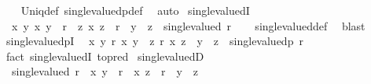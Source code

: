 \begin{isabellebody}
\ \ %
\endisadelimproof
%
\isatagproof
{}\isamarkupfalse%
\ Uniq{\isacharunderscore}{\kern0pt}def\ single{\isacharunderscore}{\kern0pt}valuedp{\isacharunderscore}{\kern0pt}def\ \isamarkupfalse%
\ auto%
\endisatagproof
{\isafoldproof}%
%
\isadelimproof
\isanewline
%
\endisadelimproof
\isanewline
{}\isamarkupfalse%
\ single{\isacharunderscore}{\kern0pt}valuedI{\isacharcolon}{\kern0pt}\isanewline
\ \ {\isachardoublequoteopen}{\isacharparenleft}{\kern0pt}{\isasymAnd}x\ y{\isachardot}{\kern0pt}\ {\isacharparenleft}{\kern0pt}x{\isacharcomma}{\kern0pt}\ y{\isacharparenright}{\kern0pt}\ {\isasymin}\ r\ {\isasymLongrightarrow}\ {\isacharparenleft}{\kern0pt}{\isasymAnd}z{\isachardot}{\kern0pt}\ {\isacharparenleft}{\kern0pt}x{\isacharcomma}{\kern0pt}\ z{\isacharparenright}{\kern0pt}\ {\isasymin}\ r\ {\isasymLongrightarrow}\ y\ {\isacharequal}{\kern0pt}\ z{\isacharparenright}{\kern0pt}{\isacharparenright}{\kern0pt}\ {\isasymLongrightarrow}\ single{\isacharunderscore}{\kern0pt}valued\ r{\isachardoublequoteclose}\isanewline
%
\isadelimproof
\ \ %
\endisadelimproof
%
\isatagproof
{}\isamarkupfalse%
\ single{\isacharunderscore}{\kern0pt}valued{\isacharunderscore}{\kern0pt}def\ \isamarkupfalse%
\ blast%
\endisatagproof
{\isafoldproof}%
%
\isadelimproof
\isanewline
%
\endisadelimproof
\isanewline
{}\isamarkupfalse%
\ single{\isacharunderscore}{\kern0pt}valuedpI{\isacharcolon}{\kern0pt}\isanewline
\ \ {\isachardoublequoteopen}{\isacharparenleft}{\kern0pt}{\isasymAnd}x\ y{\isachardot}{\kern0pt}\ r\ x\ y\ {\isasymLongrightarrow}\ {\isacharparenleft}{\kern0pt}{\isasymAnd}z{\isachardot}{\kern0pt}\ r\ x\ z\ {\isasymLongrightarrow}\ y\ {\isacharequal}{\kern0pt}\ z{\isacharparenright}{\kern0pt}{\isacharparenright}{\kern0pt}\ {\isasymLongrightarrow}\ single{\isacharunderscore}{\kern0pt}valuedp\ r{\isachardoublequoteclose}\isanewline
%
\isadelimproof
\ \ %
\endisadelimproof
%
\isatagproof
{}\isamarkupfalse%
\ {\isacharparenleft}{\kern0pt}fact\ single{\isacharunderscore}{\kern0pt}valuedI\ {\isacharbrackleft}{\kern0pt}to{\isacharunderscore}{\kern0pt}pred{\isacharbrackright}{\kern0pt}{\isacharparenright}{\kern0pt}%
\endisatagproof
{\isafoldproof}%
%
\isadelimproof
\isanewline
%
\endisadelimproof
\isanewline
{}\isamarkupfalse%
\ single{\isacharunderscore}{\kern0pt}valuedD{\isacharcolon}{\kern0pt}\isanewline
\ \ {\isachardoublequoteopen}single{\isacharunderscore}{\kern0pt}valued\ r\ {\isasymLongrightarrow}\ {\isacharparenleft}{\kern0pt}x{\isacharcomma}{\kern0pt}\ y{\isacharparenright}{\kern0pt}\ {\isasymin}\ r\ {\isasymLongrightarrow}\ {\isacharparenleft}{\kern0pt}x{\isacharcomma}{\kern0pt}\ z{\isacharparenright}{\kern0pt}\ {\isasymin}\ r\ {\isasymLongrightarrow}\ y\ {\isacharequal}{\kern0pt}\ z{\isachardoublequoteclose}\isanewline

\end{isabellebody}
